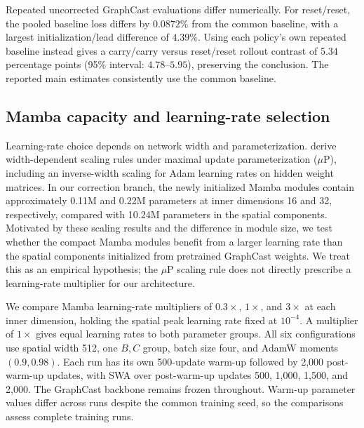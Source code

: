 \documentclass[11pt]{article}
\begin{document}
Repeated uncorrected GraphCast evaluations differ numerically. For reset/reset, the pooled baseline loss differs by $0.0872\%$ from the common baseline, with a largest initialization/lead difference of $4.39\%$. Using each policy's own repeated baseline instead gives a carry/carry versus reset/reset rollout contrast of $5.34$ percentage points (95\% interval: $4.78$--$5.95$), preserving the conclusion. The reported main estimates consistently use the common baseline.



\subsection{\texorpdfstring{{Mamba capacity and learning-rate selection}}{Mamba capacity and learning-rate selection}}
\label{sec:training_sensitivity}

{Learning-rate choice depends on network width and parameterization. \citet{yang2022tensorprogramsv} derive width-dependent scaling rules under maximal update parameterization ($\mu$P), including an inverse-width scaling for Adam learning rates on hidden weight matrices. In our correction branch, the newly initialized Mamba modules contain approximately 0.11M and 0.22M parameters at inner dimensions 16 and 32, respectively, compared with 10.24M parameters in the spatial components. Motivated by these scaling results and the difference in module size, we test whether the compact Mamba modules benefit from a larger learning rate than the spatial components initialized from pretrained GraphCast weights. We treat this as an empirical hypothesis; the $\mu$P scaling rule does not directly prescribe a learning-rate multiplier for our architecture.}

{We compare Mamba learning-rate multipliers of $0.3\times$, $1\times$, and $3\times$ at each inner dimension, holding the spatial peak learning rate fixed at $10^{-4}$. A multiplier of $1\times$ gives equal learning rates to both parameter groups. All six configurations use spatial width 512, one $B,C$ group, batch size four, and AdamW moments $(0.9,0.98)$. Each run has its own 500-update warm-up followed by 2,000 post-warm-up updates, with SWA over post-warm-up updates 500, 1,000, 1,500, and 2,000. The GraphCast backbone remains frozen throughout. Warm-up parameter values differ across runs despite the common training seed, so the comparisons assess complete training runs.}
\end{document}
